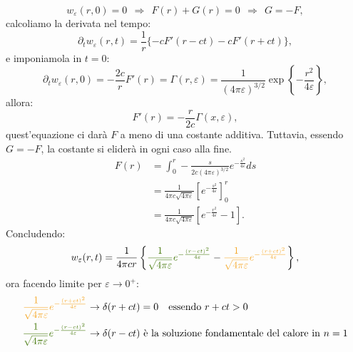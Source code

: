 \documentclass[10pt,a4paper,twoside,openright]{book}
\begin{document}
\begin{equation*}
	w_{\varepsilon }( r,0) =0\ \ \Rightarrow \ \ F( r) +G( r) =0\ \ \Rightarrow \ \ G=-F,
\end{equation*}
calcoliamo la derivata nel tempo:
\begin{equation*}
	\partial _{t} w_{\varepsilon }( r,t) =\frac{1}{r}\{-cF'( r-ct) -cF'( r+ct)\} ,
\end{equation*}
e imponiamola in $\displaystyle t=0$:
\begin{equation*}
	\partial _{t} w_{\varepsilon }( r,0) =-\frac{2c}{r} F'( r) =\Gamma ( r,\varepsilon ) =\frac{1}{( 4\pi \varepsilon )^{3/2}}\exp\left\{-\frac{r^{2}}{4\varepsilon }\right\} ,
\end{equation*}
allora:
\begin{equation*}
	F'( r) =-\frac{r}{2c} \Gamma ( x,\varepsilon ) ,
\end{equation*}
quest'equazione ci darà $\displaystyle F$ a meno di una costante additiva. Tuttavia, essendo $\displaystyle G=-F$, la costante si eliderà in ogni caso alla fine.
\begin{align*}
	F( r) & =\int _{0}^{r} -\frac{s}{2c( 4\pi \varepsilon )^{3/2}} e^{-\frac{s^{2}}{4\varepsilon }} ds      \\
	      & =\frac{1}{4\pi c\sqrt{4\pi \varepsilon }}\left[ e^{-\frac{s^{2}}{4\varepsilon }}\right]_{0}^{r} \\
	      & =\frac{1}{4\pi c\sqrt{4\pi \varepsilon }}\left[ e^{-\frac{r^{2}}{4\varepsilon }} -1\right] .    
\end{align*}
Concludendo:
\begin{equation*}
	w_{\varepsilon }( r,t) =\frac{1}{4\pi cr}\left\{\textcolor[rgb]{0.25,0.46,0.02}{\frac{1}{\sqrt{4\pi \varepsilon }}e^{-\frac{( r-ct)^{2}}{4\varepsilon}}} -\textcolor[rgb]{0.96,0.65,0.14}{\frac{1}{\sqrt{4\pi \varepsilon }}e^{-\frac{( r+ct)^{2}}{4\varepsilon}}}\right\} ,
\end{equation*}
ora facendo limite per $\displaystyle \varepsilon \rightarrow 0^{+}$:
\begin{align*}
	\textcolor[rgb]{0.96,0.65,0.14}{\frac{1}{\sqrt{4\pi \varepsilon }}e^{-\frac{( r+ct)^{2}}{4\varepsilon}}} & \rightarrow \delta (r+ct)=0 \quad \text{essendo} \ r+ct>0                                            \\
	\textcolor[rgb]{0.25,0.46,0.02}{\frac{1}{\sqrt{4\pi \varepsilon }}e^{-\frac{( r-ct)^{2}}{4\varepsilon}}} & \rightarrow \delta (r-ct)\ \text{è la soluzione fondamentale del calore in}\ n=1 
\end{align*}
\end{document}
